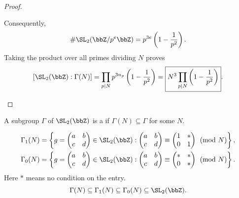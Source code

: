 \begin{proof}
\begin{enumerate}[label=(\arabic*)]
        Consequently,
        \[
            \#\SL_2(\bbZ/p^e\bbZ)
            = p^{3e}\left(1 - \frac1{p^2}\right).
        \]
        Taking the product over all primes dividing $N$ proves
        \[
            [\SL_2(\bbZ) : \Gamma(N)]
            = \prod_{p \mid N}p^{3n_p}\left(1 - \frac1{p^2}\right)
            = \boxed{N^3\prod_{p \mid N}\left(1 - \frac1{p^2}\right)}.
        \]
    \end{enumerate}
\end{proof}

\begin{definition}\label{Def:MF_congruence}
    A subgroup $\Gamma$ of $\SL_2(\bbZ)$ is a  if $\Gamma(N) \subseteq \Gamma$ for some $N$.
\end{definition}
\begin{example}
    \begin{align*}
        \Gamma_1(N) &= \left\{g = \begin{pmatrix}a & b\\ c & d\end{pmatrix} \in \SL_2(\bbZ) :
        \begin{pmatrix}a & b\\ c & d\end{pmatrix} \equiv
        \begin{pmatrix}1 & *\\ 0 & 1\end{pmatrix}\pmod N\right\}, \\
        \Gamma_0(N) &= \left\{g = \begin{pmatrix}a & b\\ c & d\end{pmatrix} \in \SL_2(\bbZ) :
        \begin{pmatrix}a & b\\ c & d\end{pmatrix} \equiv
        \begin{pmatrix}* & *\\ 0 & *\end{pmatrix}\pmod N\right\}.
    \end{align*}
    Here $*$ means no condition on the entry.
    \[
        \Gamma(N) \subseteq \Gamma_1(N) \subseteq \Gamma_0(N) \subseteq \SL_2(\bbZ).
    \]
\end{example}

